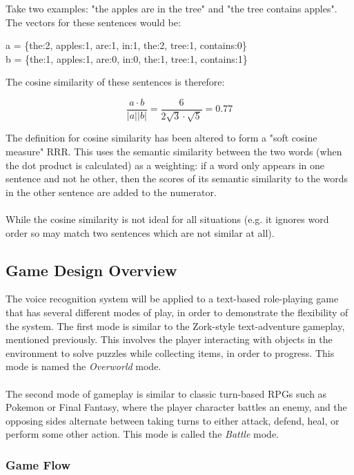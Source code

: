 \documentclass[11pt]{article}
\begin{document}
Take two examples: "the apples are in the tree" and "the tree contains apples". The vectors for these sentences would be:

\begin{center}
a = \{the:2, apples:1, are:1, in:1, the:2, tree:1, contains:0\}
\\
b = \{the:1, apples:1, are:0, in:0, the:1, tree:1, contains:1\}
\end{center}

The cosine similarity of these sentences is therefore:

$$\frac{a \cdot b}{\lvert a\rvert\lvert b\rvert} = \frac{6}{2\sqrt{3} \cdot \sqrt{5}} = 0.77$$

The definition for cosine similarity has been altered to form a "soft cosine measure" RRR. This uses the semantic similarity between the two words (when the dot product is calculated) as a weighting: if a word only appears in one sentence and not he other, then the scores of its semantic similarity to the words in the other sentence are added to the numerator.
\\
\\
While the cosine similarity is not ideal for all situations (e.g. it ignores word order so may match two sentences which are not similar at all).

\subsection{Game Design Overview}

The voice recognition system will be applied to a text-based role-playing game that has several different modes of play, in order to demonstrate the flexibility of the system. The first mode is similar to the Zork-style text-adventure gameplay, mentioned previously. This involves the player interacting with objects in the environment to solve puzzles while collecting items, in order to progress. This mode is named the \textit{Overworld} mode.
\\
\\
The second mode of gameplay is similar to classic turn-based RPGs such as Pokemon or Final Fantasy, where the player character battles an enemy, and the opposing sides alternate between taking turns to either attack, defend, heal, or perform some other action. This mode is called the \textit{Battle} mode.

\subsubsection{Game Flow}
\end{document}
